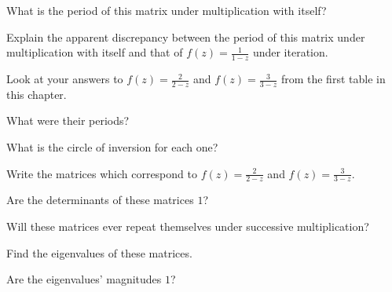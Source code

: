 \documentclass[../gatm_answers.tex]{subfiles}
\begin{document}
\begin{inner_problem}
\item What is the period of this matrix under multiplication with itself?
\end{inner_problem}

\begin{inner_problem}
\item Explain the apparent discrepancy between the period of this matrix under multiplication with itself and that of $f(z)=\frac{1}{1-z}$ under iteration.
\end{inner_problem}

\begin{outer_problem}
\item Look at your answers to $f(z)=\frac{2}{2-z}$ and $f(z)=\frac{3}{3-z}$ from the first table in this chapter.
\end{outer_problem}

\begin{inner_problem}[start=1]
\item What were their periods?
\end{inner_problem}

\begin{inner_problem}
\item What is the circle of inversion for each one?
\end{inner_problem}

\begin{inner_problem}
\item Write the matrices which correspond to $f(z)=\frac{2}{2-z}$ and $f(z)=\frac{3}{3-z}$.
\end{inner_problem}

\begin{inner_problem}
\item Are the determinants of these matrices $1$?
\end{inner_problem}

\begin{inner_problem}
\item Will these matrices ever repeat themselves under successive multiplication?
\end{inner_problem}

\begin{inner_problem}
\item Find the eigenvalues of these matrices.
\end{inner_problem}

\begin{inner_problem}
\item Are the eigenvalues' magnitudes $1$?
\end{inner_problem}
\end{document}
